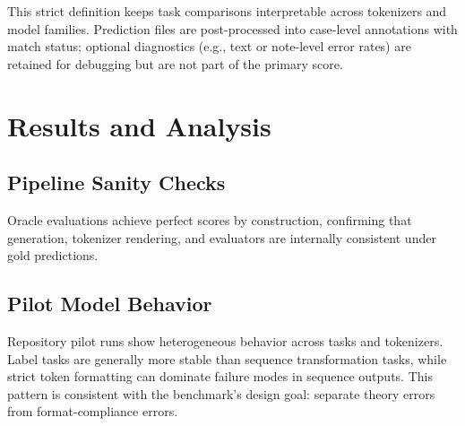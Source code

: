\documentclass{article}
\begin{document}
This strict definition keeps task comparisons interpretable across tokenizers and model families. Prediction files are post-processed into case-level annotations with match status; optional diagnostics (e.g., text or note-level error rates) are retained for debugging but are not part of the primary score.




\section{Results and Analysis}
\label{sec:results}

\subsection{Pipeline Sanity Checks}

Oracle evaluations achieve perfect scores by construction, confirming that generation, tokenizer rendering, and evaluators are internally consistent under gold predictions.

\subsection{Pilot Model Behavior}

Repository pilot runs show heterogeneous behavior across tasks and tokenizers. Label tasks are generally more stable than sequence transformation tasks, while strict token formatting can dominate failure modes in sequence outputs. This pattern is consistent with the benchmark's design goal: separate theory errors from format-compliance errors.
\end{document}
